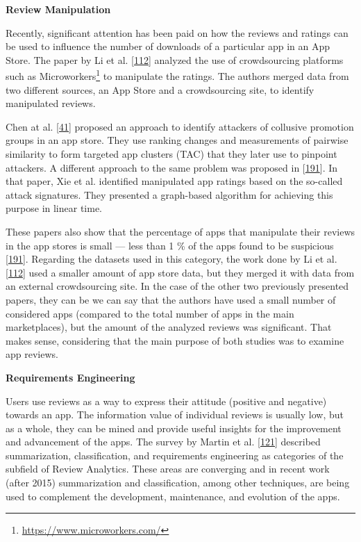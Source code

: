 \documentclass[]{book}
\let\rmarkdownfootnote\footnote%
\def\footnote{\protect\rmarkdownfootnote}
\begin{document}
\textbf{Review Manipulation}

Recently, significant attention has been paid on how the reviews and
ratings can be used to influence the number of downloads of a particular
app in an App Store. The paper by Li et al.
{[}\protect\hyperlink{ref-i2017crowdsourced}{112}{]} analyzed the use of
crowdsourcing platforms such as Microworkers\footnote{\url{https://www.microworkers.com/}}
to manipulate the ratings. The authors merged data from two different
sources, an App Store and a crowdsourcing site, to identify manipulated
reviews.

Chen at al. {[}\protect\hyperlink{ref-chen2017toward}{41}{]} proposed an
approach to identify attackers of collusive promotion groups in an app
store. They use ranking changes and measurements of pairwise similarity
to form targeted app clusters (TAC) that they later use to pinpoint
attackers. A different approach to the same problem was proposed in
{[}\protect\hyperlink{ref-xie2016you}{191}{]}. In that paper, Xie et al.
identified manipulated app ratings based on the so-called attack
signatures. They presented a graph-based algorithm for achieving this
purpose in linear time.

These papers also show that the percentage of apps that manipulate their
reviews in the app stores is small --- less than 1 \% of the apps found
to be suspicious {[}\protect\hyperlink{ref-xie2016you}{191}{]}.
Regarding the datasets used in this category, the work done by Li et al.
{[}\protect\hyperlink{ref-i2017crowdsourced}{112}{]} used a smaller
amount of app store data, but they merged it with data from an external
crowdsourcing site. In the case of the other two previously presented
papers, they can be we can say that the authors have used a small number
of considered apps (compared to the total number of apps in the main
marketplaces), but the amount of the analyzed reviews was significant.
That makes sense, considering that the main purpose of both studies was
to examine app reviews.

\textbf{Requirements Engineering}

Users use reviews as a way to express their attitude (positive and
negative) towards an app. The information value of individual reviews is
usually low, but as a whole, they can be mined and provide useful
insights for the improvement and advancement of the apps. The survey by
Martin et al. {[}\protect\hyperlink{ref-martin2015survey}{121}{]}
described summarization, classification, and requirements engineering as
categories of the subfield of Review Analytics. These areas are
converging and in recent work (after 2015) summarization and
classification, among other techniques, are being used to complement the
development, maintenance, and evolution of the apps.
\end{document}
